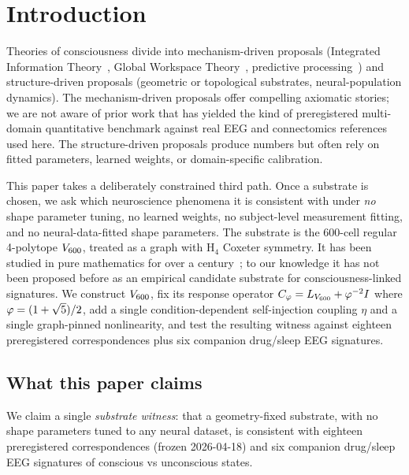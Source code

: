 \section{Introduction}\label{sec:intro}

Theories of consciousness divide into mechanism-driven proposals
(Integrated Information Theory~\citep{Tononi2008,BalduzziTononi2008},
Global Workspace Theory~\citep{Baars1988GWT,Dehaene2014ConsciousAndBrain},
predictive processing~\citep{FristonFreeEnergy2010,ClarkPP2013}) and
structure-driven proposals (geometric or topological substrates,
neural-population dynamics). The mechanism-driven proposals offer
compelling axiomatic stories; we are not aware of prior work that
has yielded the kind of preregistered multi-domain quantitative
benchmark against real EEG and connectomics references used here. The structure-driven
proposals produce numbers but often rely on fitted parameters,
learned weights, or domain-specific calibration.

This paper takes a deliberately constrained third path. Once a
substrate is chosen, we ask which neuroscience phenomena it is
consistent with under \emph{no} shape parameter tuning, no learned
weights, no subject-level measurement fitting, and no
neural-data-fitted shape parameters. The substrate is the
600-cell regular 4-polytope $V_{600}$, treated as a graph with
H$_4$ Coxeter symmetry. It has been studied in pure mathematics for
over a century~\citep{CoxeterRegularPolytopes,Weisstein600Cell}; to
our knowledge it has not been proposed before as an empirical
candidate substrate for consciousness-linked signatures. We construct $V_{600}$, fix its response
operator $C_{\varphi} = L_{V_{600}} + \varphi^{-2} I$ where $\varphi=(1+\sqrt 5)/2$, add a
single condition-dependent self-injection coupling $\eta$ and a
single graph-pinned nonlinearity, and test the resulting witness
against eighteen preregistered correspondences plus six companion
drug/sleep EEG signatures.

\subsection*{What this paper claims}

We claim a single \emph{substrate witness}: that a geometry-fixed
substrate, with no shape parameters tuned to any neural dataset, is
consistent with eighteen preregistered correspondences (frozen
2026-04-18) and six companion drug/sleep EEG signatures of
conscious vs unconscious states.

